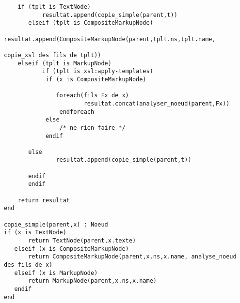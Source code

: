 \begin{verbatim}
    if (tplt is TextNode)
           resultat.append(copie_simple(parent,t))
       elseif (tplt is CompositeMarkupNode)
           resultat.append(CompositeMarkupNode(parent,tplt.ns,tplt.name,

copie_xsl des fils de tplt))
    elseif (tplt is MarkupNode)
           if (tplt is xsl:apply-templates)
            if (x is CompositeMarkupNode)

               foreach(fils Fx de x)
                       resultat.concat(analyser_noeud(parent,Fx))
                endforeach
            else
                /* ne rien faire */
            endif

       else
               resultat.append(copie_simple(parent,t))

       endif
       endif

    return resultat
end

copie_simple(parent,x) : Noeud
if (x is TextNode)
       return TextNode(parent,x.texte)
   elseif (x is CompositeMarkupNode)
       return CompositeMarkupNode(parent,x.ns,x.name, analyse_noeud des fils de x)
   elseif (x is MarkupNode)
       return MarkupNode(parent,x.ns,x.name)
   endif
end

\end{verbatim}

